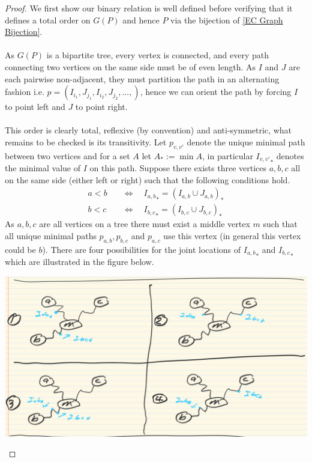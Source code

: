 \documentclass[11pt]{amsart}
\theoremstyle{definition}
\theoremstyle{remark}
\numberwithin{equation}{section}
\newcommand{\0}{\color{blue}{\mathsf{0}}}
\begin{document}
\begin{proof}
We first show our binary relation is well defined before verifying that it defines a total order on $G(P)$ and hence $P$ via the bijection of \ref{EC Graph Bijection}.
\\\\
As $G(P)$ is a bipartite tree, every vertex is connected, and every path connecting two vertices on the same side must be of even length. As $I$ and $J$ are each pairwise non-adjacent, they must partition the path in an alternating fashion i.e. $p=(I_{i_1},J_{j_1},I_{i_2},J_{j_2},..., )$, hence we can orient the path by forcing $I$ to point left and $J$ to point right.
\\\\
This order is clearly total, reflexive (by convention) and anti-symmetric, what remains to be checked is its transitivity. Let $p_{v,v'}$ denote the unique minimal path between two vertices and for a set $A$ let $A_*:= \min A$, in particular ${I_{v,v'}}_*$ denotes the minimal value of $I$ on this path. Suppose there exists three vertices $a,b,c$ all on the same side (either left or right) such that the following conditions hold.
\begin{align*}
    a<b \quad &\iff \quad {I_{a,b}}_* = ({I_{a,b}} \cup J_{a,b})_*\\
    b<c \quad &\iff \quad{I_{b,c}}_* = ({I_{b,c}} \cup J_{b,c})_*
\end{align*}
As $a,b,c$ are all vertices on a tree there must exist a middle vertex $m$ such that all unique minimal paths $p_{a,b},p_{b,c}$ and $p_{a,c}$ use this vertex (in general this vertex could be $b$). There are four possibilities for the joint locations of ${I_{a,b}}_*$ and ${I_{b,c}}_*$ which are illustrated in the figure below.
\begin{center}
\includegraphics{Images/transitivity cases.png}   
\end{center}



\end{proof}
\end{document}
